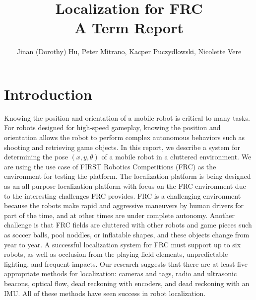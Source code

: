 \documentclass{article}
\begin{document}
\title{Localization for FRC \\
  \large{A Term Report}
  }
\author{Jinan (Dorothy) Hu, Peter Mitrano, Kacper Puczydlowski, Nicolette Vere}

\maketitle{}

\section{Introduction}

  Knowing the position and orientation of a mobile robot is critical to many tasks. For robots designed for high-speed gameplay, knowing the position and orientation allows the robot to perform complex autonomous behaviors such as shooting and retrieving game objects. In this report, we describe a system for determining the pose $(x, y, \theta)$ of a mobile robot in a cluttered environment. We are using the use case of FIRST Robotics Competitions (FRC) as the environment for testing the platform. The localization platform is being designed as an all purpose localization platform with focus on the FRC environment due to the interesting challenges FRC provides. FRC is a challenging environment because the robots make rapid and aggressive maneuvers by human drivers for part of the time, and at other times are under complete autonomy. Another challenge is that FRC fields are cluttered with other robots and game pieces such as soccer balls, pool noddles, or inflatable shapes, and these objects change from year to year. A successful localization system for FRC must support up to six robots, as well as occlusion from the playing field elements, unpredictable lighting, and frequent impacts. Our research suggests that there are at least five appropriate methods for localization: cameras and tags, radio and ultrasonic beacons, optical flow, dead reckoning with encoders, and dead reckoning with an IMU. All of these methods have seen success in robot localization.
\end{document}
